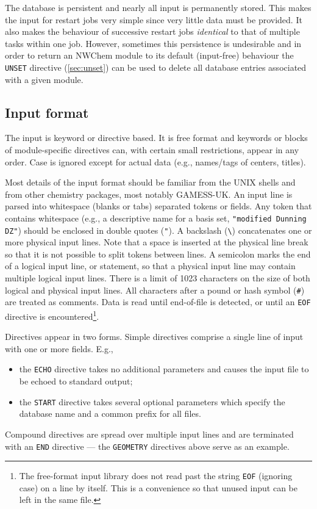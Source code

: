 \fussy

The database is persistent and nearly all input is permanently stored.
This makes the input for restart jobs very simple since very little
data must be provided.  It also makes the behaviour of successive
restart jobs {\em identical} to that of multiple tasks within one job.
However, sometimes this persistence is undesirable and in order to
return an NWChem module to its default (input-free) behaviour the
\verb+UNSET+ directive (\ref{sec:unset}) can be used to delete all
database entries associated with a given module.

\subsection{Input format}

The input is keyword or directive based.  It is free format and
keywords or blocks of module-specific directives can, with certain
small restrictions, appear in any order.  Case is ignored except
for actual data (e.g., names/tags of centers, titles).

Most details of the input format should be familiar from the UNIX
shells and from other chemistry packages, most notably GAMESS-UK.  An
input line is parsed into whitespace (blanks or tabs) separated tokens
or fields.  Any token that contains whitespace (e.g., a descriptive
name for a basis set, \verb+"modified Dunning DZ"+) should be enclosed
in double quotes (\verb+"+).  A backslash (\verb+\+) concatenates one
or more physical input lines. Note that a space is inserted at the
physical line break so that it is not possible to split tokens between
lines.  A semicolon marks the end of a logical input line, or
statement, so that a physical input line may contain multiple logical
input lines.  There is a limit of 1023 characters on the size of both
logical and physical input lines.  All characters after a pound or
hash symbol (\verb+#+) are treated as comments.  Data is read until
end-of-file is detected, or until an \verb+EOF+ directive is
encountered\footnote{The
  free-format input library does not read past the string \verb+EOF+
  (ignoring case) on a line by itself.  This is a convenience so that
  unused input can be left in the same file.}.

Directives appear in two forms.  Simple directives comprise a single
line of input with one or more fields.  E.g., 
\begin{itemize}
\item the \verb+ECHO+ directive takes no additional parameters 
  and causes the input file to be echoed to standard output;
\item the \verb+START+ directive takes several optional
      parameters which specify the database name and a common prefix
      for all files.
\end{itemize}
Compound directives are spread over multiple input lines and
are terminated with an \verb+END+ directive --- the 
\verb+GEOMETRY+ directives above serve as an example. 

